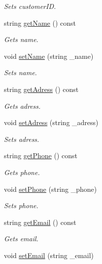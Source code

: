\begin{DoxyCompactItemize}
\begin{DoxyCompactList}\small\item\em Sets customer\+ID. \end{DoxyCompactList}\item 
string \hyperlink{classCustomer_ac987a032179493e7a75b3dbdc32c1cf9}{get\+Name} () const
\begin{DoxyCompactList}\small\item\em Gets name. \end{DoxyCompactList}\item 
void \hyperlink{classCustomer_a57953fc7e96939d1937fc7603aa31406}{set\+Name} (string \+\_\+name)
\begin{DoxyCompactList}\small\item\em Sets name. \end{DoxyCompactList}\item 
string \hyperlink{classCustomer_a2b0f5ddbc9e4730da690e8cd6391e16e}{get\+Adress} () const
\begin{DoxyCompactList}\small\item\em Gets adress. \end{DoxyCompactList}\item 
void \hyperlink{classCustomer_adfc9ac7abfa4bb4835106dc35739a4a6}{set\+Adress} (string \+\_\+adress)
\begin{DoxyCompactList}\small\item\em Sets adress. \end{DoxyCompactList}\item 
string \hyperlink{classCustomer_ac34eaf091e758c7f8c89f86af2dc29f1}{get\+Phone} () const
\begin{DoxyCompactList}\small\item\em Gets phone. \end{DoxyCompactList}\item 
void \hyperlink{classCustomer_a84e30f04f40a6ef54ec223756b0a59bf}{set\+Phone} (string \+\_\+phone)
\begin{DoxyCompactList}\small\item\em Sets phone. \end{DoxyCompactList}\item 
string \hyperlink{classCustomer_a89fe5dc7065739347c436f673c68b249}{get\+Email} () const
\begin{DoxyCompactList}\small\item\em Gets email. \end{DoxyCompactList}\item 
void \hyperlink{classCustomer_aff04d3f21f7546c394d28f7b42994719}{set\+Email} (string \+\_\+email)

\end{DoxyCompactItemize}

